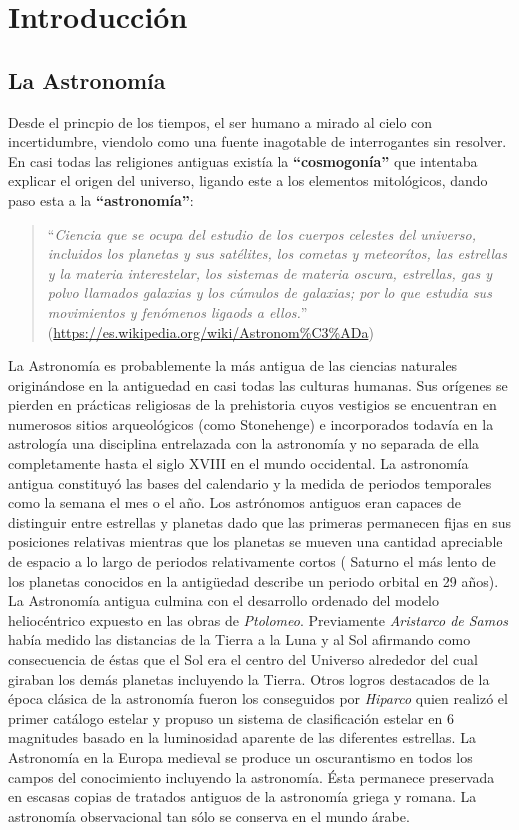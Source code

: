 \chapter{Introducción}

\section{La Astronomía}

Desde el princpio de los tiempos, el ser humano a mirado al cielo con incertidumbre, viendolo como una fuente inagotable de interrogantes sin resolver. En casi todas las religiones antiguas existía la \textbf{``cosmogonía''} que intentaba explicar el origen del universo, ligando este a los elementos mitológicos, dando paso esta a la \textbf{``astronomía''}:

\begin{quote}``\textit{Ciencia que se ocupa del estudio de los cuerpos celestes del universo, incluidos los planetas y sus satélites, los cometas y meteorítos, las estrellas y la materia interestelar, los sistemas de materia oscura, estrellas, gas y polvo llamados galaxias y los cúmulos de galaxias; por lo que estudia sus movimientos y fenómenos ligaods a ellos.}''
\newline(\url{https://es.wikipedia.org/wiki/Astronom%C3%ADa})
\end{quote}

\bigskip
 La Astronomía es probablemente la más antigua de las ciencias naturales originándose en la antiguedad en casi todas las culturas humanas. Sus orígenes se pierden en prácticas religiosas de la prehistoria cuyos vestigios se encuentran en numerosos sitios arqueológicos (como Stonehenge) e incorporados todavía en la astrología una disciplina entrelazada con la astronomía y no separada de ella completamente hasta el siglo XVIII en el mundo occidental. La astronomía antigua constituyó las bases del calendario y la medida de periodos temporales como la semana el mes o el año. Los astrónomos antiguos eran capaces de distinguir entre estrellas y planetas dado que las primeras permanecen fijas en sus posiciones relativas mientras que los planetas se mueven una cantidad apreciable de espacio a lo largo de periodos relativamente cortos ( Saturno el más lento de los planetas conocidos en la antigüedad describe un periodo orbital en 29 años). La Astronomía antigua culmina con el desarrollo ordenado del modelo heliocéntrico expuesto en las obras de \textit{Ptolomeo}. Previamente \textit{Aristarco de Samos} había medido las distancias de la Tierra a la Luna y al Sol afirmando como consecuencia de éstas que el Sol era el centro del Universo alrededor del cual giraban los demás planetas incluyendo la Tierra. Otros logros destacados de la época clásica de la astronomía fueron los conseguidos por \textit{Hiparco} quien realizó el primer catálogo estelar y propuso un sistema de clasificación estelar en 6 magnitudes basado en la luminosidad aparente de las diferentes estrellas. La Astronomía en la Europa medieval se produce un oscurantismo en todos los campos del conocimiento incluyendo la astronomía. Ésta permanece preservada en escasas copias de tratados antiguos de la astronomía griega y romana. La astronomía observacional tan sólo se conserva en el mundo árabe.

